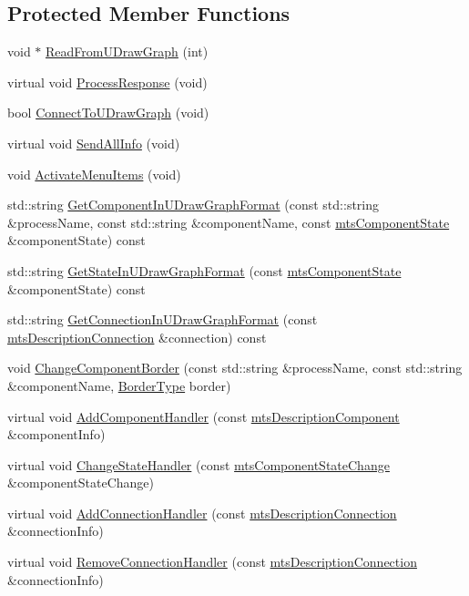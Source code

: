 \subsection*{Protected Member Functions}
\begin{DoxyCompactItemize}
\item 
void $\ast$ \hyperlink{classmts_component_viewer_aa5dd9cbc4a1d8408158e88311d3b447b}{Read\-From\-U\-Draw\-Graph} (int)
\item 
virtual void \hyperlink{classmts_component_viewer_a5adcc3b205fdb2d3b391929222137457}{Process\-Response} (void)
\item 
bool \hyperlink{classmts_component_viewer_a5ede805581fd5650f323f57ebb53eee6}{Connect\-To\-U\-Draw\-Graph} (void)
\item 
virtual void \hyperlink{classmts_component_viewer_adce96720fed764a7fc1cc9598c74b524}{Send\-All\-Info} (void)
\item 
void \hyperlink{classmts_component_viewer_ab8a3016cf3b814fff4132646c8545401}{Activate\-Menu\-Items} (void)
\item 
std\-::string \hyperlink{classmts_component_viewer_a94496c56f20040de1e87a0c36df1925a}{Get\-Component\-In\-U\-Draw\-Graph\-Format} (const std\-::string \&process\-Name, const std\-::string \&component\-Name, const \hyperlink{classmts_component_state}{mts\-Component\-State} \&component\-State) const 
\item 
std\-::string \hyperlink{classmts_component_viewer_a3c1f904308cac38bf80a506eece45e8f}{Get\-State\-In\-U\-Draw\-Graph\-Format} (const \hyperlink{classmts_component_state}{mts\-Component\-State} \&component\-State) const 
\item 
std\-::string \hyperlink{classmts_component_viewer_a3f1d129888db918924b042da0d84eebd}{Get\-Connection\-In\-U\-Draw\-Graph\-Format} (const \hyperlink{classmts_description_connection}{mts\-Description\-Connection} \&connection) const 
\item 
void \hyperlink{classmts_component_viewer_a4d5ea188a34cac5faa644618b1c55e2c}{Change\-Component\-Border} (const std\-::string \&process\-Name, const std\-::string \&component\-Name, \hyperlink{classmts_component_viewer_a2bd239a01fe3124526c4322e7305b99f}{Border\-Type} border)
\item 
virtual void \hyperlink{classmts_component_viewer_a119208a52ff869e4d7d687a04e8e1c08}{Add\-Component\-Handler} (const \hyperlink{classmts_description_component}{mts\-Description\-Component} \&component\-Info)
\item 
virtual void \hyperlink{classmts_component_viewer_a1efc788ff4196c270e6e2d185b8c6104}{Change\-State\-Handler} (const \hyperlink{classmts_component_state_change}{mts\-Component\-State\-Change} \&component\-State\-Change)
\item 
virtual void \hyperlink{classmts_component_viewer_ad9a2f2ba75fa8f47d4540ee448ba3983}{Add\-Connection\-Handler} (const \hyperlink{classmts_description_connection}{mts\-Description\-Connection} \&connection\-Info)
\item 
virtual void \hyperlink{classmts_component_viewer_a8ccf7105c4fa2b28f3f38fe9ea671806}{Remove\-Connection\-Handler} (const \hyperlink{classmts_description_connection}{mts\-Description\-Connection} \&connection\-Info)
\end{DoxyCompactItemize}
